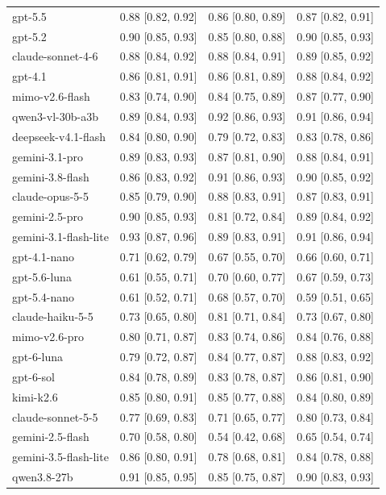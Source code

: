 \begin{table}
\begin{tabular}{llll}
gpt-5.5 & 0.88 [0.82, 0.92] & 0.86 [0.80, 0.89] & 0.87 [0.82, 0.91] \\
gpt-5.2 & 0.90 [0.85, 0.93] & 0.85 [0.80, 0.88] & 0.90 [0.85, 0.93] \\
claude-sonnet-4-6 & 0.88 [0.84, 0.92] & 0.88 [0.84, 0.91] & 0.89 [0.85, 0.92] \\
gpt-4.1 & 0.86 [0.81, 0.91] & 0.86 [0.81, 0.89] & 0.88 [0.84, 0.92] \\
mimo-v2.6-flash & 0.83 [0.74, 0.90] & 0.84 [0.75, 0.89] & 0.87 [0.77, 0.90] \\
qwen3-vl-30b-a3b & 0.89 [0.84, 0.93] & 0.92 [0.86, 0.93] & 0.91 [0.86, 0.94] \\
deepseek-v4.1-flash & 0.84 [0.80, 0.90] & 0.79 [0.72, 0.83] & 0.83 [0.78, 0.86] \\
gemini-3.1-pro & 0.89 [0.83, 0.93] & 0.87 [0.81, 0.90] & 0.88 [0.84, 0.91] \\
gemini-3.8-flash & 0.86 [0.83, 0.92] & 0.91 [0.86, 0.93] & 0.90 [0.85, 0.92] \\
claude-opus-5-5 & 0.85 [0.79, 0.90] & 0.88 [0.83, 0.91] & 0.87 [0.83, 0.91] \\
gemini-2.5-pro & 0.90 [0.85, 0.93] & 0.81 [0.72, 0.84] & 0.89 [0.84, 0.92] \\
gemini-3.1-flash-lite & 0.93 [0.87, 0.96] & 0.89 [0.83, 0.91] & 0.91 [0.86, 0.94] \\
gpt-4.1-nano & 0.71 [0.62, 0.79] & 0.67 [0.55, 0.70] & 0.66 [0.60, 0.71] \\
gpt-5.6-luna & 0.61 [0.55, 0.71] & 0.70 [0.60, 0.77] & 0.67 [0.59, 0.73] \\
gpt-5.4-nano & 0.61 [0.52, 0.71] & 0.68 [0.57, 0.70] & 0.59 [0.51, 0.65] \\
claude-haiku-5-5 & 0.73 [0.65, 0.80] & 0.81 [0.71, 0.84] & 0.73 [0.67, 0.80] \\
mimo-v2.6-pro & 0.80 [0.71, 0.87] & 0.83 [0.74, 0.86] & 0.84 [0.76, 0.88] \\
gpt-6-luna & 0.79 [0.72, 0.87] & 0.84 [0.77, 0.87] & 0.88 [0.83, 0.92] \\
gpt-6-sol & 0.84 [0.78, 0.89] & 0.83 [0.78, 0.87] & 0.86 [0.81, 0.90] \\
kimi-k2.6 & 0.85 [0.80, 0.91] & 0.85 [0.77, 0.88] & 0.84 [0.80, 0.89] \\
claude-sonnet-5-5 & 0.77 [0.69, 0.83] & 0.71 [0.65, 0.77] & 0.80 [0.73, 0.84] \\
gemini-2.5-flash & 0.70 [0.58, 0.80] & 0.54 [0.42, 0.68] & 0.65 [0.54, 0.74] \\
gemini-3.5-flash-lite & 0.86 [0.80, 0.91] & 0.78 [0.68, 0.81] & 0.84 [0.78, 0.88] \\
qwen3.8-27b & 0.91 [0.85, 0.95] & 0.85 [0.75, 0.87] & 0.90 [0.83, 0.93] \\
\bottomrule
\end{tabular}
\end{table}
